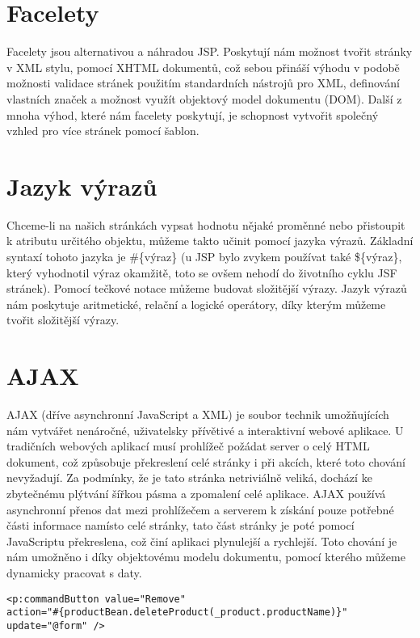\documentclass[122pt,oneside]{fithesis}
\begin{document}
\section{Facelety}
Facelety jsou alternativou a náhradou JSP. Poskytují nám možnost tvořit stránky v XML stylu, pomocí XHTML dokumentů, což sebou přináší výhodu v podobě možnosti validace stránek použitím standardních nástrojů pro XML, definování vlastních značek a možnost využít objektový model dokumentu (DOM). Další z mnoha výhod, které nám facelety poskytují, je schopnost vytvořit společný vzhled pro více stránek pomocí šablon. 

\section{Jazyk výrazů}
Chceme-li na našich stránkách vypsat hodnotu nějaké proměnné nebo přistoupit k atributu určitého objektu, můžeme takto učinit pomocí jazyka výrazů. Základní syntaxí tohoto jazyka je \#\{výraz\} (u JSP bylo zvykem používat také \$\{výraz\}, který vyhodnotil výraz okamžitě, toto se ovšem nehodí do životního cyklu JSF stránek). Pomocí tečkové notace můžeme budovat složitější výrazy. Jazyk výrazů nám poskytuje aritmetické, relační a logické operátory, díky kterým můžeme tvořit složitější výrazy.

\section{AJAX}
AJAX (dříve asynchronní JavaScript a XML) je soubor technik umožňujících nám vytvářet nenáročné, uživatelsky přívětivé a interaktivní webové aplikace. U tradičních webových aplikací musí prohlížeč požádat server o celý HTML dokument, což způsobuje překreslení celé stránky i při akcích, které toto chování nevyžadují. Za podmínky, že je tato stránka netriviálně veliká, dochází ke zbytečnému plýtvání šířkou pásma a zpomalení celé aplikace. AJAX používá asynchronní přenos dat mezi prohlížečem a serverem k získání pouze potřebné části informace namísto celé stránky, tato část stránky je poté pomocí JavaScriptu překreslena, což činí aplikaci plynulejší a rychlejší. Toto chování je nám umožněno i díky objektovému modelu dokumentu, pomocí kterého můžeme dynamicky pracovat s daty.

\begin{lstlisting}
<p:commandButton value="Remove" 
action="#{productBean.deleteProduct(_product.productName)}"
update="@form" />
\end{lstlisting}
\end{document}

